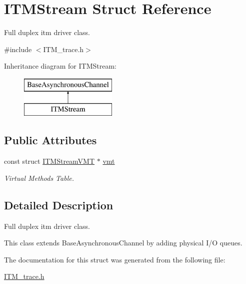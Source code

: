 \hypertarget{structITMStream}{\section{I\+T\+M\+Stream Struct Reference}
\label{structITMStream}
}


Full duplex itm driver class.  




{\ttfamily \#include $<$I\+T\+M\+\_\+trace.\+h$>$}

Inheritance diagram for I\+T\+M\+Stream\+:\begin{figure}[H]
\begin{center}
\leavevmode
\includegraphics[height=2.000000cm]{structITMStream}
\end{center}
\end{figure}
\subsection*{Public Attributes}
\begin{DoxyCompactItemize}
\item 
\hypertarget{structITMStream_a243b326e52dc6ffcc22e5ecabb2a3e2a}{const struct \hyperlink{structITMStreamVMT}{I\+T\+M\+Stream\+V\+M\+T} $\ast$ \hyperlink{structITMStream_a243b326e52dc6ffcc22e5ecabb2a3e2a}{vmt}}\label{structITMStream_a243b326e52dc6ffcc22e5ecabb2a3e2a}

\begin{DoxyCompactList}\small\item\em Virtual Methods Table. \end{DoxyCompactList}\end{DoxyCompactItemize}


\subsection{Detailed Description}
Full duplex itm driver class. 

This class extends {\ttfamily Base\+Asynchronous\+Channel} by adding physical I/\+O queues. 

The documentation for this struct was generated from the following file\+:\begin{DoxyCompactItemize}
\item 
\hyperlink{ITM__trace_8h}{I\+T\+M\+\_\+trace.\+h}\end{DoxyCompactItemize}
